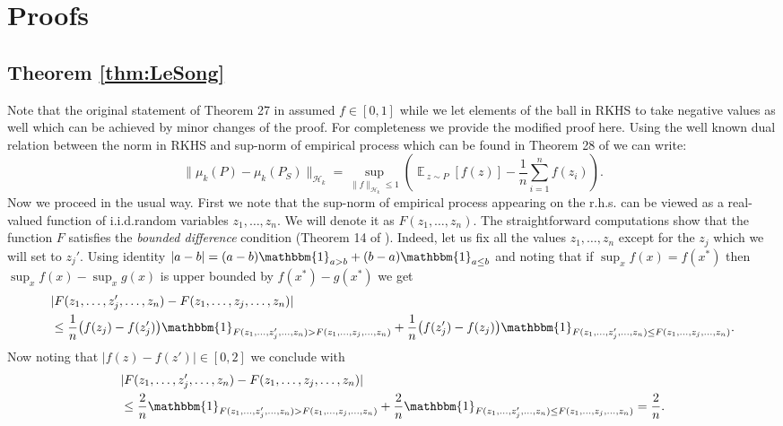 \documentclass{article}
\DeclareMathOperator*{\E}{\mathbb{E}\,}
\renewcommand{\H}{\mathcal{H}}
\begin{document}
\section{Proofs}\label{sec:proofs}

\subsection{Theorem \ref{thm:LeSong}}
\label{proof:LeSong}
Note that the original statement of Theorem 27 in \cite{S06} assumed
$f\in[0,1]$ while we let elements of the ball in RKHS to take negative values
as well which can be achieved by minor changes of the proof.  For completeness
we provide the modified proof here.  Using the well known dual relation between
the norm in RKHS and sup-norm of empirical process which can be found in
Theorem 28 of \cite{S06} we can write:
\begin{equation}
\label{eq:RKHS-duality}
\|\mu_k(P)-\mu_k(P_S)\|_{\H_k}
=
\sup_{\|f\|_{\H_k}\leq 1}\left(
\E_{z\sim P}[f(z)]
-
\frac{1}{n}\sum_{i=1}^n f(z_i)
\right).
\end{equation}
Now we proceed in the usual way.  First we note that the sup-norm of empirical
process appearing on the r.h.s. can be viewed as a real-valued function of
i.i.d.\:random variables $z_1,\dots,z_n$.  We will denote it as
$F(z_1,\dots,z_n)$.  The straightforward computations show that the function
$F$ satisfies the \emph{bounded difference} condition (Theorem 14 of
\cite{S06}). Indeed, let us fix all the values $z_1,\dots,z_n$ except for the
$z_j$ which we will set to $z_j'$.  Using identity $|a-b| =
(a-b)\mathbbm{1}_{a>b} + (b-a)\mathbbm{1}_{a\leq b}$ and noting that if $\sup_x
f(x) = f(x^*)$ then $\sup_x f(x) - \sup_x g(x)$ is upper bounded by $f(x^*) -
g(x^*)$ we get
\begin{align*}
&|F(z_1,\dots,z_j',\dots,z_n) - F(z_1,\dots,z_j,\dots,z_n)|
\\
&\leq
\frac{1}{n}\bigl(f(z_j) - f(z_j')\bigr)\mathbbm{1}_{F(z_1,\dots,z_j',\dots,z_n) > F(z_1,\dots,z_j,\dots,z_n)}
+
\frac{1}{n}\bigl(f(z_j') - f(z_j)\bigr)\mathbbm{1}_{F(z_1,\dots,z_j',\dots,z_n) \leq F(z_1,\dots,z_j,\dots,z_n)}.
\end{align*}
Now noting that $|f(z) - f(z')|\in[0,2]$ we conclude with
\begin{align*}
&
|F(z_1,\dots,z_j',\dots,z_n) - F(z_1,\dots,z_j,\dots,z_n)|\\
&\leq 
\frac{2}{n}\mathbbm{1}_{F(z_1,\dots,z_j',\dots,z_n) > F(z_1,\dots,z_j,\dots,z_n)}
+
\frac{2}{n}\mathbbm{1}_{F(z_1,\dots,z_j',\dots,z_n) \leq F(z_1,\dots,z_j,\dots,z_n)} = \frac{2}{n}.
\end{align*}
\end{document}
